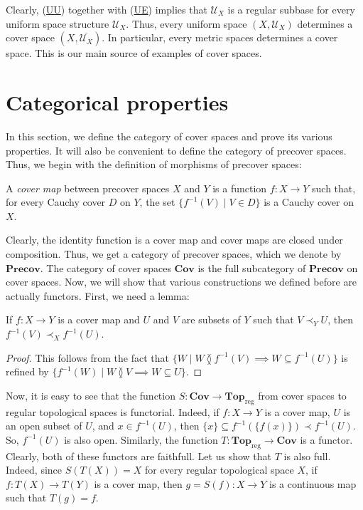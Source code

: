 \documentclass[reqno]{amsart}
\newcommand{\axref}[1]{(\hyperref[ax:#1]{#1})}
\theoremstyle{definition}
\theoremstyle{remark}
\numberwithin{figure}{section}
\newcommand{\overlap}[2]{#1 \between #2}
\newcommand{\rb}{\prec}
\newcommand{\cat}[1]{\mathbf{#1}}
\begin{document}
Clearly, \axref{UU} together with \axref{UE} implies that $\mathcal{U}_X$ is a regular subbase for every uniform space structure $\mathcal{U}_X$.
Thus, every uniform space $(X,\mathcal{U}_X)$ determines a cover space $(X,\overline{\mathcal{U}_X})$.
In particular, every metric spaces determines a cover space.
This is our main source of examples of cover spaces.

\section{Categorical properties}

In this section, we define the category of cover spaces and prove its various properties.
It will also be convenient to define the category of precover spaces.
Thus, we begin with the definition of morphisms of precover spaces:

\begin{defn}
A \emph{cover map} between precover spaces $X$ and $Y$ is a function $f : X \to Y$ such that, for every Cauchy cover $D$ on $Y$, the set $\{ f^{-1}(V) \mid V \in D \}$ is a Cauchy cover on $X$.
\end{defn}

Clearly, the identity function is a cover map and cover maps are closed under composition.
Thus, we get a category of precover spaces, which we denote by $\cat{Precov}$.
The category of cover spaces $\cat{Cov}$ is the full subcategory of $\cat{Precov}$ on cover spaces.
Now, we will show that various constructions we defined before are actually functors.
First, we need a lemma:

\begin{lem}
If $f : X \to Y$ is a cover map and $U$ and $V$ are subsets of $Y$ such that $V \rb_Y U$, then $f^{-1}(V) \rb_X f^{-1}(U)$.
\end{lem}
\begin{proof}
This follows from the fact that $\{ W \mid \overlap{W}{f^{-1}(V)} \implies W \subseteq f^{-1}(U) \}$ is refined by $\{ f^{-1}(W) \mid \overlap{W}{V} \implies W \subseteq U \}$.
\end{proof}

Now, it is easy to see that the function $S : \cat{Cov} \to \cat{Top}_\mathrm{reg}$ from cover spaces to regular topological spaces is functorial.
Indeed, if $f : X \to Y$ is a cover map, $U$ is an open subset of $U$, and $x \in f^{-1}(U)$, then $\{ x \} \subseteq f^{-1}(\{ f(x) \}) \rb f^{-1}(U)$.
So, $f^{-1}(U)$ is also open.
Similarly, the function $T : \cat{Top}_\mathrm{reg} \to \cat{Cov}$ is a functor.
Clearly, both of these functors are faithfull.
Let us show that $T$ is also full.
Indeed, since $S(T(X)) = X$ for every regular topological space $X$, if $f : T(X) \to T(Y)$ is a cover map, then $g = S(f) : X \to Y$ is a continuous map such that $T(g) = f$.
\end{document}
